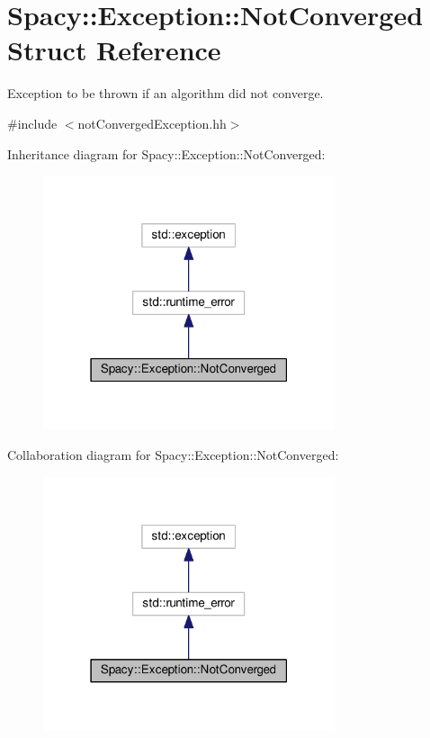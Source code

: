 \hypertarget{structSpacy_1_1Exception_1_1NotConverged}{}\section{Spacy\+:\+:Exception\+:\+:Not\+Converged Struct Reference}
\label{structSpacy_1_1Exception_1_1NotConverged}


Exception to be thrown if an algorithm did not converge.  




{\ttfamily \#include $<$not\+Converged\+Exception.\+hh$>$}



Inheritance diagram for Spacy\+:\+:Exception\+:\+:Not\+Converged\+:
\nopagebreak
\begin{figure}[H]
\begin{center}
\leavevmode
\includegraphics[width=243pt]{structSpacy_1_1Exception_1_1NotConverged__inherit__graph}
\end{center}
\end{figure}


Collaboration diagram for Spacy\+:\+:Exception\+:\+:Not\+Converged\+:
\nopagebreak
\begin{figure}[H]
\begin{center}
\leavevmode
\includegraphics[width=243pt]{structSpacy_1_1Exception_1_1NotConverged__coll__graph}
\end{center}
\end{figure}
